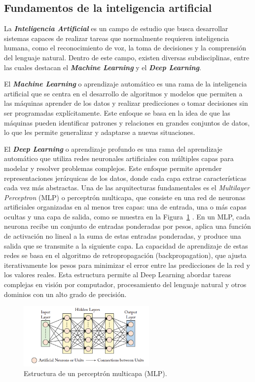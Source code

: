 \documentclass[11pt,spanish,listoffigures,listoftables]{tfgetsinf}
\begin{document}
\subsection{Fundamentos de la inteligencia artificial}
La \textit{\textbf{Inteligencia Artificial}} es un campo de estudio que busca desarrollar sistemas capaces de realizar tareas que normalmente requieren inteligencia humana, como el reconocimiento de voz, la toma de decisiones y la comprensión del lenguaje natural. Dentro de este campo, existen diversas subdisciplinas, entre las cuales destacan el \textit{\textbf{Machine Learning}} y el \textit{\textbf{Deep Learning}}.

El \textit{\textbf{Machine Learning}} o aprendizaje automático es una rama de la inteligencia artificial que se centra en el desarrollo de algoritmos y modelos que permiten a las máquinas aprender de los datos y realizar predicciones o tomar decisiones sin ser programadas explícitamente. Este enfoque se basa en la idea de que las máquinas pueden identificar patrones y relaciones en grandes conjuntos de datos, lo que les permite generalizar y adaptarse a nuevas situaciones.

El \textit{\textbf{Deep Learning}} o aprendizaje profundo es una rama del aprendizaje automático que utiliza redes neuronales artificiales con múltiples capas para modelar y resolver problemas complejos. Este enfoque permite aprender representaciones jerárquicas de los datos, donde cada capa extrae características cada vez más abstractas. Una de las arquitecturas fundamentales es el \textit{Multilayer Perceptron} (MLP) o perceptrón multicapa, que consiste en una red de neuronas artificiales organizadas en al menos tres capas: una de entrada, una o más capas ocultas y una capa de salida, como se muestra en la Figura~\ref{fig:multilayer_perceptron} \cite{khan2018guide}. En un MLP, cada neurona recibe un conjunto de entradas ponderadas por pesos, aplica una función de activación no lineal a la suma de estas entradas ponderadas, y produce una salida que se transmite a la siguiente capa. La capacidad de aprendizaje de estas redes se basa en el algoritmo de retropropagación (backpropagation), que ajusta iterativamente los pesos para minimizar el error entre las predicciones de la red y los valores reales. Esta estructura permite al Deep Learning abordar tareas complejas en visión por computador, procesamiento del lenguaje natural y otros dominios con un alto grado de precisión.

\begin{figure}[H]
   \centering
   \includegraphics[width=0.6\textwidth]{images/estado_del_arte/multilayer_perceptron.png}
   \caption{Estructura de un perceptrón multicapa (MLP).}
   \label{fig:multilayer_perceptron}
\end{figure}
\end{document}
